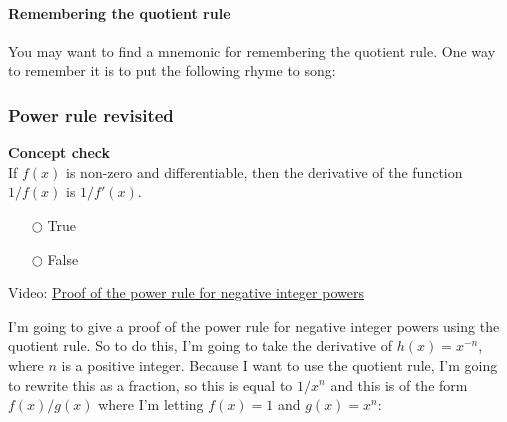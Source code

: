 \documentclass[pdftex, brazil, 12pt, twoside]{article}
\begin{document}
\paragraph{Remembering the quotient rule} You may want to find a mnemonic for
remembering the quotient rule. One way to remember it is to put the following
rhyme to song:

\begin{figure}[H]
  \begin{center}
  \end{center}
\end{figure}

\subsubsection{Power rule revisited}
\label{u2-quotient-rule-power-revisited}

\begin{exercise}
  \textbf{Concept check}\\%
  If $f(x)$ is non-zero and differentiable, then the derivative of the function
  $1/f(x)$ is $1/f'(x)$.
  \begin{itemize}[noitemsep]
  \item[$\bigcirc$] True
  \item[$\bigcirc$] False
  \end{itemize}
\end{exercise}

Video: \href{https://www.youtube.com/watch?v=39Of1mh59iw}{Proof of the power rule for negative integer powers}

I'm going to give a proof of the power rule
for negative integer powers using the quotient rule.
So to do this, I'm going to take the derivative of $h(x) =  x^{-n}$,
where $n$ is a positive integer.
Because I want to use the quotient rule,
I'm going to rewrite this as a fraction,
so this is equal to $1/x^n$ and this is of the form
$f(x)/g(x)$ where I'm letting $f(x) = 1$
and $g(x) = x^n$:
\end{document}
